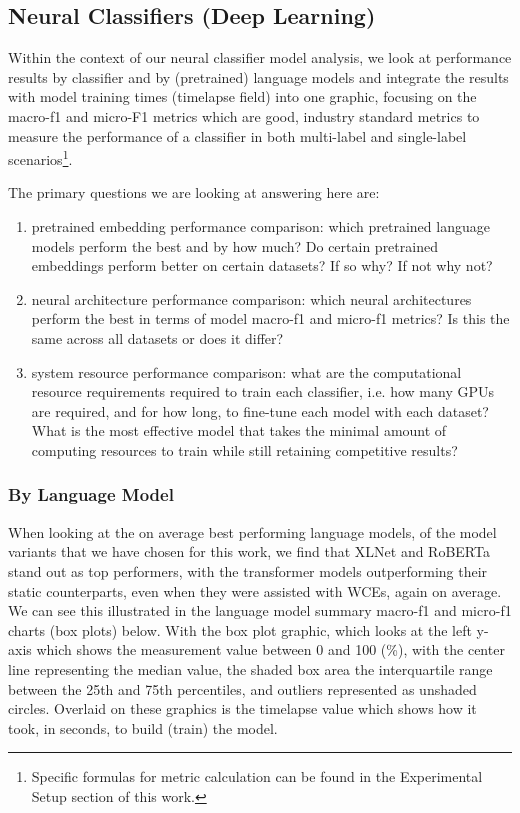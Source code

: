 \documentclass[final]{clv2025}
\begin{document}
\subsection{Neural Classifiers (Deep Learning)}

Within the context of our neural classifier model analysis, we look at performance results by classifier and by (pretrained) language models and integrate the results with model training times (timelapse field) into one graphic, focusing on the macro-f1 and micro-F1 metrics which are good, industry standard metrics to measure the performance of a classifier in both multi-label and single-label scenarios\footnote{Specific formulas for metric calculation can be found in the Experimental Setup section of this work.}.  

The primary questions we are looking at answering here are:
\begin{enumerate}
    \item pretrained embedding performance comparison: which pretrained language models perform the best and by how much? Do certain pretrained embeddings perform better on certain datasets? If so why? If not why not?
    \item 	neural architecture performance comparison: which neural architectures perform the best in terms of model macro-f1 and micro-f1 metrics? Is this the same across all datasets or does it differ?
    \item system resource performance comparison: what are the computational resource requirements required to train each classifier, i.e. how many GPUs are required, and for how long, to fine-tune each model with each dataset? What is the most effective model that takes the minimal amount of computing resources to train while still retaining competitive results?
\end{enumerate}

\subsubsection{By Language Model} 

When looking at the on average best performing language models, of the model variants that we have chosen for this work, we find that XLNet and RoBERTa stand out as top performers, with the transformer models outperforming their static counterparts, even when they were assisted with WCEs, again on average. We can see this illustrated in the language model summary macro-f1 and micro-f1 charts (box plots) below. With the box plot graphic, which looks at the left y-axis which shows the measurement value between 0 and 100 (\%), with the center line representing the median value, the shaded box area the interquartile range between the 25th and 75th percentiles, and outliers represented as unshaded circles. Overlaid on these graphics is the timelapse value which shows how it took, in seconds, to build (train) the model.
\end{document}
